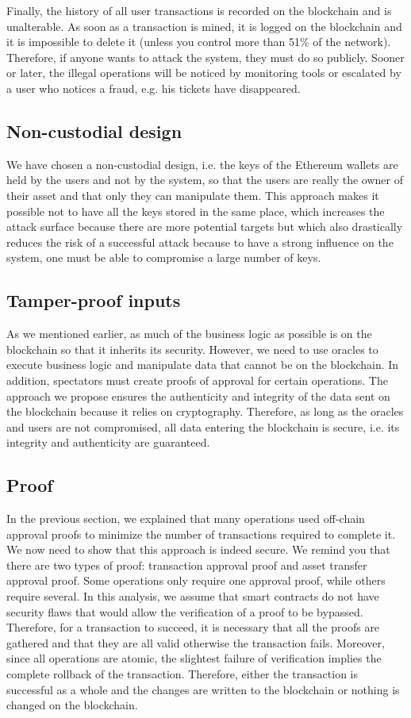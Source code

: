 \documentclass[a4paper,11pt,oneside]{report}
\begin{document}
Finally, the history of all user transactions is recorded on the blockchain and is unalterable. As soon as a transaction is mined, it is logged on the blockchain and it is impossible to delete it (unless you control more than 51\% of the network). Therefore, if anyone wants to attack the system, they must do so publicly. Sooner or later, the illegal operations will be noticed by monitoring tools or escalated by a user who notices a fraud, e.g. his tickets have disappeared.

\subsection{Non-custodial design}
We have chosen a non-custodial design, i.e. the keys of the Ethereum wallets are held by the users and not by the system, so that the users are really the owner of their asset and that only they can manipulate them. This approach makes it possible not to have all the keys stored in the same place, which increases the attack surface because there are more potential targets but which also drastically reduces the risk of a successful attack because to have a strong influence on the system, one must be able to compromise a large number of keys.

\subsection{Tamper-proof inputs}
As we mentioned earlier, as much of the business logic as possible is on the blockchain so that it inherits its security. However, we need to use oracles to execute business logic and manipulate data that cannot be on the blockchain. In addition, spectators must create proofs of approval for certain operations. The approach we propose ensures the authenticity and integrity of the data sent on the blockchain because it relies on cryptography. Therefore, as long as the oracles and users are not compromised, all data entering the blockchain is secure, i.e. its integrity and authenticity are guaranteed.

\subsection{Proof}
In the previous section, we explained that many operations used off-chain approval proofs to minimize the number of transactions required to complete it. We now need to show that this approach is indeed secure. We remind you that there are two types of proof: transaction approval proof and asset transfer approval proof. Some operations only require one approval proof, while others require several. In this analysis, we assume that smart contracts do not have security flaws that would allow the verification of a proof to be bypassed. Therefore, for a transaction to succeed, it is necessary that all the proofs are gathered and that they are all valid otherwise the transaction fails. Moreover, since all operations are atomic, the slightest failure of verification implies the complete rollback of the transaction. Therefore, either the transaction is successful as a whole and the changes are written to the blockchain or nothing is changed on the blockchain.
\end{document}
